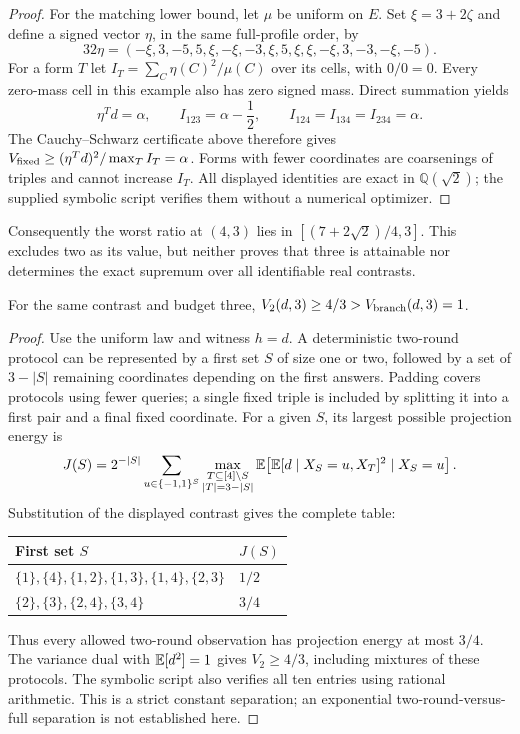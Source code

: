 \begin{proof}
For the matching lower bound, let $\mu$ be uniform on $E$. Set $\xi=3+2\zeta$ and define a signed vector $\eta$, in the same full-profile order, by
\[
 32\eta=(-\xi,3,-5,5,\xi,-\xi,-3,\xi,5,\xi,\xi,-\xi,3,-3,-\xi,-5).
\]
For a form $T$ let $I_T=\sum_C\eta(C)^2/\mu(C)$ over its cells, with $0/0=0$. Every zero-mass cell in this example also has zero signed mass. Direct summation yields
\[
 \eta^Td=\alpha,\qquad
 I_{123}=\alpha-\frac12,\qquad
 I_{124}=I_{134}=I_{234}=\alpha.
\]
The Cauchy--Schwarz certificate above therefore gives $V_{\rm fixed}\ge(\eta^Td)^2/\max_T I_T=\alpha$. Forms with fewer coordinates are coarsenings of triples and cannot increase $I_T$. All displayed identities are exact in $\mathbb Q(\sqrt2)$; the supplied symbolic script verifies them without a numerical optimizer.
\end{proof}
Consequently the worst ratio at $(4,3)$ lies in $[(7+2\sqrt2)/4,3]$. This excludes two as its value, but neither proves that three is attainable nor determines the exact supremum over all identifiable real contrasts.

\begin{corollary}\label{cor:roundseparation}
For the same contrast and budget three, $V_2(d,3)\ge4/3>V_{\rm branch}(d,3)=1$.
\end{corollary}
\begin{proof}
Use the uniform law and witness $h=d$. A deterministic two-round protocol can be represented by a first set $S$ of size one or two, followed by a set of $3-|S|$ remaining coordinates depending on the first answers. Padding covers protocols using fewer queries; a single fixed triple is included by splitting it into a first pair and a final fixed coordinate. For a given $S$, its largest possible projection energy is
\[
 J(S)=2^{-|S|}\sum_{u\in\{-1,1\}^S}
 \max_{\substack{T\subseteq[4]\setminus S\\|T|=3-|S|}}
 \mathbb{E}\!\left[\mathbb{E}[d\mid X_S=u,X_T]^2\mid X_S=u\right].
\]
Substitution of the displayed contrast gives the complete table:
\begin{center}
\begin{tabular}{ll}
\toprule
First set $S$ & $J(S)$\\
\midrule
$\{1\},\{4\},\{1,2\},\{1,3\},\{1,4\},\{2,3\}$ & $1/2$\\
$\{2\},\{3\},\{2,4\},\{3,4\}$ & $3/4$\\
\bottomrule
\end{tabular}
\end{center}
Thus every allowed two-round observation has projection energy at most $3/4$. The variance dual with $\mathbb{E}[d^2]=1$ gives $V_2\ge4/3$, including mixtures of these protocols. The symbolic script also verifies all ten entries using rational arithmetic. This is a strict constant separation; an exponential two-round-versus-full separation is not established here.
\end{proof}
